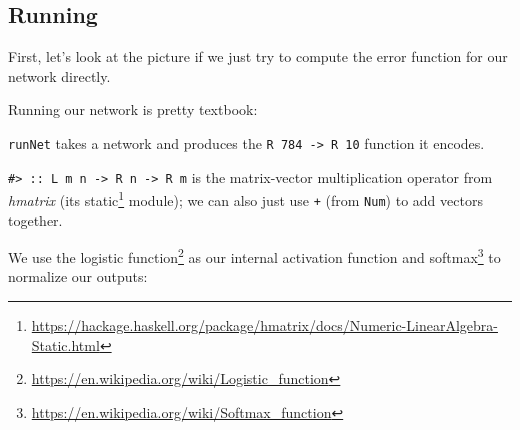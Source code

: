 \documentclass[]{article}
\newenvironment{Shaded}{}{}
\newcommand{\CommentTok}[1]{\textcolor[rgb]{0.38,0.63,0.69}{\textit{#1}}}
\newcommand{\DataTypeTok}[1]{\textcolor[rgb]{0.56,0.13,0.00}{#1}}
\newcommand{\DecValTok}[1]{\textcolor[rgb]{0.25,0.63,0.44}{#1}}
\newcommand{\KeywordTok}[1]{\textcolor[rgb]{0.00,0.44,0.13}{\textbf{#1}}}
\newcommand{\NormalTok}[1]{#1}
\newcommand{\OperatorTok}[1]{\textcolor[rgb]{0.40,0.40,0.40}{#1}}
\newcommand{\OtherTok}[1]{\textcolor[rgb]{0.00,0.44,0.13}{#1}}
\renewcommand{\href}[2]{#2\footnote{\url{#1}}}
\begin{document}
\subsection{Running}\label{running}

First, let's look at the picture if we just try to compute the error function
for our network directly.

Running our network is pretty textbook:

\begin{Shaded}
\end{Shaded}

\texttt{runNet} takes a network and produces the
\texttt{R\ 784\ -\textgreater{}\ R\ 10} function it encodes.

\texttt{\#\textgreater{}\ ::\ L\ m\ n\ -\textgreater{}\ R\ n\ -\textgreater{}\ R\ m}
is the matrix-vector multiplication operator from \emph{hmatrix} (its
\href{https://hackage.haskell.org/package/hmatrix/docs/Numeric-LinearAlgebra-Static.html}{static}
module); we can also just use \texttt{+} (from \texttt{Num}) to add vectors
together.

We use the \href{https://en.wikipedia.org/wiki/Logistic_function}{logistic
function} as our internal activation function and
\href{https://en.wikipedia.org/wiki/Softmax_function}{softmax} to normalize our
outputs:
\end{document}
